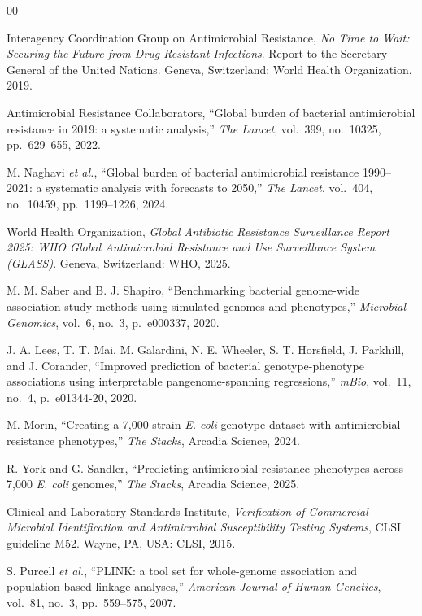 \documentclass[journal]{IEEEtran}
\begin{document}
\begin{thebibliography}{00}

 Interagency Coordination Group on Antimicrobial Resistance, \textit{No Time to Wait: Securing the Future from Drug-Resistant Infections}. Report to the Secretary-General of the United Nations. Geneva, Switzerland: World Health Organization, 2019.

 Antimicrobial Resistance Collaborators, ``Global burden of bacterial antimicrobial resistance in 2019: a systematic analysis,'' \textit{The Lancet}, vol.~399, no.~10325, pp.~629--655, 2022.

 M. Naghavi \textit{et al.}, ``Global burden of bacterial antimicrobial resistance 1990--2021: a systematic analysis with forecasts to 2050,'' \textit{The Lancet}, vol.~404, no.~10459, pp.~1199--1226, 2024.

 World Health Organization, \textit{Global Antibiotic Resistance Surveillance Report 2025: WHO Global Antimicrobial Resistance and Use Surveillance System (GLASS)}. Geneva, Switzerland: WHO, 2025.

 M. M. Saber and B. J. Shapiro, ``Benchmarking bacterial genome-wide association study methods using simulated genomes and phenotypes,'' \textit{Microbial Genomics}, vol.~6, no.~3, p.~e000337, 2020.

 J. A. Lees, T. T. Mai, M. Galardini, N. E. Wheeler, S. T. Horsfield, J. Parkhill, and J. Corander, ``Improved prediction of bacterial genotype-phenotype associations using interpretable pangenome-spanning regressions,'' \textit{mBio}, vol.~11, no.~4, p.~e01344-20, 2020.

 M. Morin, ``Creating a 7,000-strain \textit{E. coli} genotype dataset with antimicrobial resistance phenotypes,'' \textit{The Stacks}, Arcadia Science, 2024.

 R. York and G. Sandler, ``Predicting antimicrobial resistance phenotypes across 7,000 \textit{E. coli} genomes,'' \textit{The Stacks}, Arcadia Science, 2025.

 Clinical and Laboratory Standards Institute, \textit{Verification of Commercial Microbial Identification and Antimicrobial Susceptibility Testing Systems}, CLSI guideline M52. Wayne, PA, USA: CLSI, 2015.

 S. Purcell \textit{et al.}, ``PLINK: a tool set for whole-genome association and population-based linkage analyses,'' \textit{American Journal of Human Genetics}, vol.~81, no.~3, pp.~559--575, 2007.


\end{thebibliography}
\end{document}
